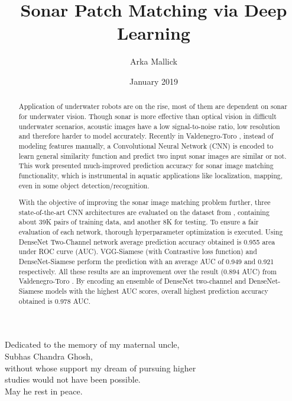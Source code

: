 \documentclass[thesis]{mas_report}
\author{Arka Mallick}
\title{Sonar Patch Matching via Deep Learning}
\date{January 2019}
\begin{document}
\begin{titlepage}
    \maketitle
\end{titlepage}

\pagestyle{plain}


\cleardoublepage
\statementpage

\begin{abstract}
Application of underwater robots are on the rise, most of them are dependent on sonar for underwater vision. Though sonar is more effective than optical vision in difficult underwater scenarios, acoustic images
have a low signal-to-noise ratio, low resolution and therefore harder to model accurately. Recently in Valdenegro-Toro \cite{stateoftheart}, instead of modeling features manually, a Convolutional Neural Network (CNN) 
is encoded to learn general similarity function and predict two input sonar images are similar or not. This work presented much-improved prediction accuracy for sonar image matching functionality, which is instrumental in aquatic applications
like localization, mapping, even in some object detection/recognition. 

With the objective of improving the sonar image matching problem further, three state-of-the-art CNN architectures are evaluated
on the dataset from \cite{stateoftheart}, containing about 39K pairs of training data, and another 8K for testing. To ensure a fair evaluation of each network, thorough hyperparameter optimization is executed. 
Using DenseNet Two-Channel network average prediction accuracy obtained is 0.955 area under ROC curve (AUC). VGG-Siamese (with Contrastive loss function) and DenseNet-Siamese perform the prediction with an average 
AUC of 0.949 and 0.921 respectively. All these results are an improvement over the result (0.894 AUC) from Valdenegro-Toro \cite{stateoftheart}. By encoding an ensemble of DenseNet two-channel and DenseNet-Siamese 
models with the highest AUC scores, overall highest prediction accuracy obtained is 0.978 AUC.
\end{abstract}

\cleardoublepage


\begin{dedication}
 Dedicated to the memory of my maternal uncle,\\ Subhas Chandra Ghosh,\\
 without whose support my dream of pursuing higher\\ studies would not have been possible.\\
 May he rest in peace.
\end{dedication}
\end{document}
